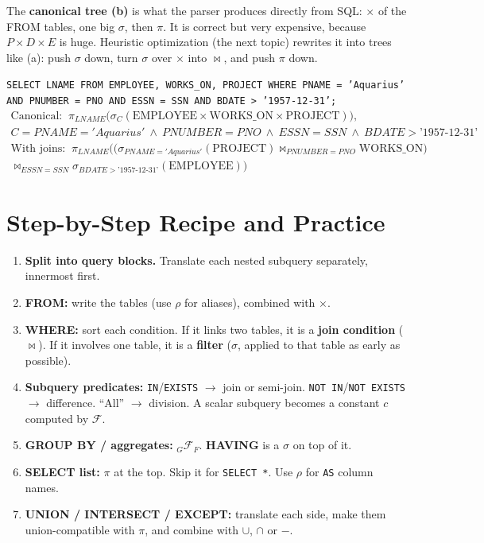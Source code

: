 \documentclass[10pt,a4paper]{article}
\newcommand{\R}[1]{\mathrm{#1}}          %
\newcommand{\agg}{\mathcal{F}}            %
\begin{document}
The \textbf{canonical tree (b)} is what the parser produces directly from SQL: $\times$ of the FROM tables, one big $\sigma$, then $\pi$. It is correct but very expensive, because $P \times D \times E$ is huge. Heuristic optimization (the next topic) rewrites it into trees like (a): push $\sigma$ down, turn $\sigma$ over $\times$ into $\bowtie$, and push $\pi$ down.

\begin{exbox}
\texttt{SELECT LNAME FROM EMPLOYEE, WORKS\_ON, PROJECT WHERE PNAME = 'Aquarius' AND PNUMBER = PNO AND ESSN = SSN AND BDATE > '1957-12-31';}
\begin{gather*}
\text{Canonical: }\ \pi_{LNAME}\big(\sigma_{C}(\R{EMPLOYEE} \times \R{WORKS\_ON} \times \R{PROJECT})\big),\\
C = PNAME='Aquarius'\ \wedge\ PNUMBER=PNO\ \wedge\ ESSN=SSN\ \wedge\ BDATE>\text{'1957-12-31'}
\end{gather*}
\begin{multline*}
\text{With joins: }\ \pi_{LNAME}\Big(\big(\sigma_{PNAME='Aquarius'}(\R{PROJECT}) \bowtie_{PNUMBER=PNO} \R{WORKS\_ON}\big)\\
\bowtie_{ESSN=SSN} \sigma_{BDATE>\text{'1957-12-31'}}(\R{EMPLOYEE})\Big)
\end{multline*}
\end{exbox}

\section{Step-by-Step Recipe and Practice}

\begin{keybox}
\begin{enumerate}
  \item \textbf{Split into query blocks.} Translate each nested subquery separately, innermost first.
  \item \textbf{FROM:} write the tables (use $\rho$ for aliases), combined with $\times$.
  \item \textbf{WHERE:} sort each condition. If it links two tables, it is a \textbf{join condition} ($\bowtie$). If it involves one table, it is a \textbf{filter} ($\sigma$, applied to that table as early as possible).
  \item \textbf{Subquery predicates:} \texttt{IN}/\texttt{EXISTS} $\to$ join or semi-join. \texttt{NOT IN}/\texttt{NOT EXISTS} $\to$ difference. ``All'' $\to$ division. A scalar subquery becomes a constant $c$ computed by $\agg$.
  \item \textbf{GROUP BY / aggregates:} ${}_{G}\agg_{F}$. \textbf{HAVING} is a $\sigma$ on top of it.
  \item \textbf{SELECT list:} $\pi$ at the top. Skip it for \texttt{SELECT *}. Use $\rho$ for \texttt{AS} column names.
  \item \textbf{UNION / INTERSECT / EXCEPT:} translate each side, make them union-compatible with $\pi$, and combine with $\cup$, $\cap$ or $-$.
\end{enumerate}
\end{keybox}
\end{document}
